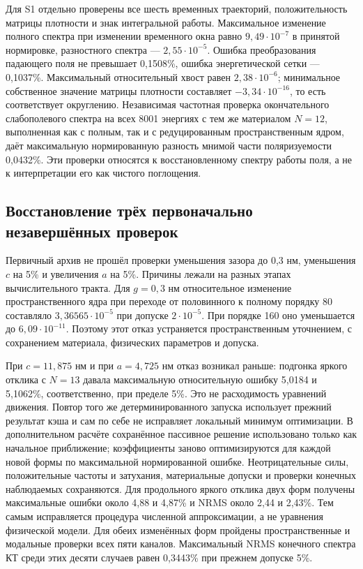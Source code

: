 Для S1 отдельно проверены все шесть временных траекторий,
положительность матрицы плотности и знак интегральной работы.
Максимальное изменение полного спектра при изменении временного
окна равно $9{,}49\cdot10^{-7}$ в принятой нормировке,
разностного спектра --- $2{,}55\cdot10^{-5}$.
Ошибка преобразования падающего поля не превышает 0,1508\%,
ошибка энергетической сетки --- 0,1037\%.
Максимальный относительный хвост равен $2{,}38\cdot10^{-6}$;
минимальное собственное значение матрицы плотности составляет
$-3{,}34\cdot10^{-16}$, то есть соответствует округлению.
Независимая частотная проверка окончательного слабополевого спектра
на всех 8001 энергиях с тем же материалом $N=12$, выполненная
как с полным, так и с редуцированным пространственным ядром,
даёт максимальную нормированную разность мнимой части
поляризуемости 0,0432\%. Эти проверки относятся к восстановленному
спектру работы поля, а не к интерпретации его как чистого поглощения.

\subsection{Восстановление трёх первоначально незавершённых проверок}
Первичный архив не прошёл проверки уменьшения зазора до 0,3 нм,
уменьшения $c$ на 5\% и увеличения $a$ на 5\%. Причины лежали
на разных этапах вычислительного тракта.
Для $g=0{,}3$ нм относительное изменение пространственного ядра
при переходе от половинного к полному порядку 80 составляло
$3{,}36565\cdot10^{-5}$ при допуске $2\cdot10^{-5}$.
При порядке 160 оно уменьшается до $6{,}09\cdot10^{-11}$.
Поэтому этот отказ устраняется пространственным уточнением,
с сохранением материала, физических параметров и допуска.

При $c=11{,}875$ нм и при $a=4{,}725$ нм отказ возникал раньше:
подгонка яркого отклика с $N=13$ давала максимальную относительную
ошибку 5,0184 и 5,1062\%, соответственно, при пределе 5\%.
Это не расходимость уравнений движения. Повтор того же
детерминированного запуска использует прежний результат кэша и сам
по себе не исправляет локальный минимум оптимизации.
В дополнительном расчёте сохранённое пассивное решение использовано
только как начальное приближение; коэффициенты заново оптимизируются
для каждой новой формы по максимальной нормированной ошибке.
Неотрицательные силы, положительные частоты и затухания,
материальные допуски и проверки конечных наблюдаемых сохраняются.
Для продольного яркого отклика двух форм получены максимальные ошибки
около 4,88 и 4,87\% и NRMS около 2,44 и 2,43\%.
Тем самым исправляется процедура
численной аппроксимации, а не уравнения физической модели.
Для обеих изменённых форм пройдены пространственные и модальные
проверки всех пяти каналов. Максимальный NRMS конечного спектра
КТ среди этих десяти случаев равен 0,3443\% при прежнем допуске 5\%.

